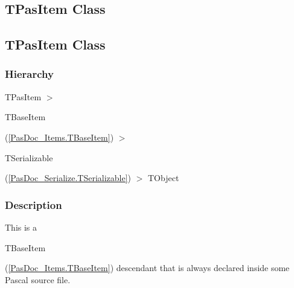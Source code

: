 \documentclass{report}
\begin{document}
\subsection*{\large{\textbf{TPasItem Class}}\normalsize\hspace{1ex}\hrulefill}
\else
\subsection*{TPasItem Class}
\fi
\label{PasDoc_Items.TPasItem}
\subsubsection*{\large{\textbf{Hierarchy}}\normalsize\hspace{1ex}\hfill}
TPasItem {$>$} \begin{ttfamily}TBaseItem\end{ttfamily}(\ref{PasDoc_Items.TBaseItem}) {$>$} \begin{ttfamily}TSerializable\end{ttfamily}(\ref{PasDoc_Serialize.TSerializable}) {$>$} 
TObject
\subsubsection*{\large{\textbf{Description}}\normalsize\hspace{1ex}\hfill}
This is a \begin{ttfamily}TBaseItem\end{ttfamily}(\ref{PasDoc_Items.TBaseItem}) descendant that is always declared inside some Pascal source file.
\end{document}
